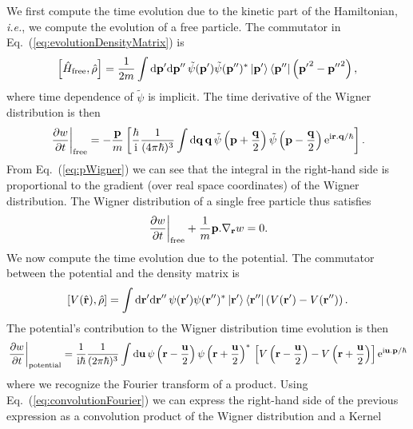 We first compute the time evolution due to the kinetic part of the Hamiltonian, \textit{i.e.}, we compute the evolution of a free particle.
The commutator in Eq.~(\ref{eq:evolutionDensityMatrix}) is
\begin{equation}
	\left[ \hat{H}_{\text{free}} , \hat{\rho} \right] =
	\frac{1}{2m} \int \mathrm{d}\mathbf{ p' }\mathrm{d}\mathbf{ p'' } \, \tilde{\psi}(\mathbf{ p' }) \tilde{\psi}(\mathbf{ p'' })^{\ast} \left| \mathbf{ p' } \right\rangle \left\langle \mathbf{ p'' } \right| \left(\mathbf{ p' }^2 - \mathbf{ p'' }^2\right) ,
	\nonumber
\end{equation}
where time dependence of $\tilde{\psi}$ is implicit.
The time derivative of the Wigner distribution is then
\begin{equation}
	\left.\frac{\partial w}{\partial t}\right|_{\text{free}} = 
	- \frac{\mathbf{ p }}{m} \left[ \frac{\hbar}{\mathrm{i}} \frac{1}{(4\pi\hbar)^3}
	\int \mathrm{d}\mathbf{ q } \,\mathbf{ q } \, \tilde{\psi}\left( \mathbf{ p }+\frac{\mathbf{ q }}{2} \right) \tilde{\psi}\left( \mathbf{ p }-\frac{\mathbf{ q }}{2} \right) \mathrm{e}^{\mathrm{i} \mathbf{ r }.\mathbf{ q }/\hbar } \right] .
	\nonumber
\end{equation}
From Eq.~(\ref{eq:pWigner}) we can see that the integral in the right-hand side is proportional to the gradient (over real space coordinates) of the Wigner distribution.
The Wigner distribution of a single free particle thus satisfies
\begin{equation}
	\label{eq:freeEvolution}
	\left.\frac{\partial w}{\partial t}\right|_{\text{free}} + \frac{1}{m} \mathbf{ p }.\nabla_{\mathbf{ r }} w = 0 .
\end{equation}
We now compute the time evolution due to the potential.
The commutator between the potential and the density matrix is
\begin{equation}
	\left[ V(\hat{\mathbf{ r }}) , \hat{\rho} \right] =
	\int \mathrm{d}\mathbf{ r' }\mathrm{d}\mathbf{ r'' } \, \psi(\mathbf{ r' }) \psi(\mathbf{ r'' })^{\ast} \left| \mathbf{ r' } \right\rangle \left\langle \mathbf{ r'' } \right| \left(V(\mathbf{ r' }) - V(\mathbf{ r'' })\right) .
	\nonumber
\end{equation}
The potential's contribution to the Wigner distribution time evolution is then
\begin{equation}
	\left.\frac{\partial w}{\partial t}\right|_{\text{potential}} =
	\frac{1}{\mathrm{i}\hbar} \frac{1}{(2\pi\hbar)^3}
	\int \mathrm{d}\mathbf{ u } \, \psi\left( \mathbf{ r }-\frac{\mathbf{ u }}{2} \right) \psi\left( \mathbf{ r }+\frac{\mathbf{ u }}{2} \right)^{\ast} \, \left[ V\left( \mathbf{ r }-\frac{\mathbf{ u }}{2} \right) - V\left(\mathbf{ r }+\frac{\mathbf{ u }}{2}\right) \right] \mathrm{e}^{\mathrm{i} \mathbf{ u }.\mathbf{ p }/\hbar }
	\nonumber
\end{equation}
where we recognize the Fourier transform of a product. Using Eq.~(\ref{eq:convolutionFourier}) we can express the right-hand side of the previous expression as a convolution product of the Wigner distribution and a Kernel
